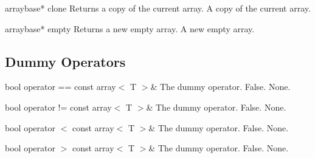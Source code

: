 \setConstInstance
\printEmptyMethodReturn
{arraybase*}
{clone}
{Returns a copy of the current array.}
{A copy of the current array.}

\setConstInstance
\printEmptyMethodReturn
{arraybase*}
{empty}
{Returns a new empty array.}
{A new empty array.}

\vspace*{10mm}

\subsection{Dummy Operators}

\setConstInstance
\printMethodWithOneParam
{bool}
{operator ==}
{const array$<$ T $>$\&}
{}
{}
{The dummy operator.}
{False.}
{None.}

\setConstInstance
\printMethodWithOneParam
{bool}
{operator !=}
{const array$<$ T $>$\&}
{}
{}
{The dummy operator.}
{False.}
{None.}

\clearpage

\setConstInstance
\printMethodWithOneParam
{bool}
{operator $<$}
{const array$<$ T $>$\&}
{}
{}
{The dummy operator.}
{False.}
{None.}

\setConstInstance
\printMethodWithOneParam
{bool}
{operator $>$}
{const array$<$ T $>$\&}
{}
{}
{The dummy operator.}
{False.}
{None.}

